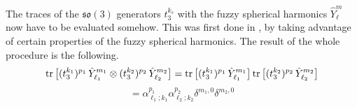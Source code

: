 %
%
The traces of the $\mathfrak{so}(3)$ generators $t_3^{k_s}$ with the fuzzy spherical harmonics $\hat{Y}_{\ell}^{m}$ now have to be evaluated somehow. This was first done in \cite{Two-point functions in D5-D3}, by taking advantage of certain properties of the fuzzy spherical harmonics. The result of the whole procedure is the following.
%
%
\begin{equation*}
\tr \big[ (t_3^{k_1})^{p_1} \, \hat{Y}_{\ell_1}^{m_1} \otimes (t_3^{k_2})^{p_2} \, \hat{Y}_{\ell_2}^{m_2} \big]
=
\tr \big[ (t_3^{k_1})^{p_1} \, \hat{Y}_{\ell_1}^{m_1} \big]
\tr \big[ (t_3^{k_2})^{p_2} \, \hat{Y}_{\ell_2}^{m_2} \big]
\end{equation*}
%
%
\begin{equation}\label{alpha trace}
=
\alpha_{\ell_1;k_1}^{p_1} \alpha_{\ell_2;k_2}^{p_2}
\delta^{m_1,0} \delta^{m_2,0}
\end{equation}
%
%


